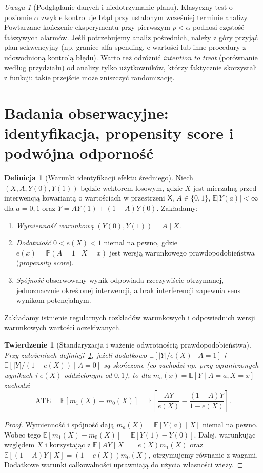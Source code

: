 \documentclass[11pt,a4paper,oneside]{report}
\numberwithin{equation}{chapter}
\theoremstyle{plain}
\newtheorem{twierdzenie}{Twierdzenie}[chapter]
\theoremstyle{definition}
\newtheorem{definicja}{Definicja}[chapter]
\theoremstyle{remark}
\newtheorem{uwaga}{Uwaga}[chapter]
\newcommand{\Prob}{\mathbb P}
\newcommand{\E}{\mathbb E}
\begin{document}
\begin{uwaga}[Podglądanie danych i niedotrzymanie planu]
Klasyczny test o poziomie $\alpha$ zwykle kontroluje błąd przy ustalonym wcześniej terminie analizy. Powtarzane kończenie eksperymentu przy pierwszym $p<\alpha$ podnosi częstość fałszywych alarmów. Jeśli potrzebujemy analiz pośrednich, należy z góry przyjąć plan sekwencyjny (np. granice alfa-spending, e-wartości lub inne procedury z udowodnioną kontrolą błędu). Warto też odróżnić \emph{intention to treat} (porównanie według przydziału) od analizy tylko użytkowników, którzy faktycznie skorzystali z funkcji: takie przejście może zniszczyć randomizację.
\end{uwaga}

\section{Badania obserwacyjne: identyfikacja, propensity score i podwójna odporność}
\begin{definicja}[Warunki identyfikacji efektu średniego]\label{def:causal-id}
Niech $(X,A,Y(0),Y(1))$ będzie wektorem losowym, gdzie $X$ jest mierzalną przed interwencją kowariantą o wartościach w przestrzeni $\mathsf X$, $A\in\{0,1\}$, $\E|Y(a)|<\infty$ dla $a=0,1$ oraz $Y=AY(1)+(1-A)Y(0)$. Zakładamy:
\begin{enumerate}
\item \emph{Wymienność warunkową} $(Y(0),Y(1))\perp A\mid X$.
\item \emph{Dodatniość} $0<e(X)<1$ niemal na pewno, gdzie $e(x)=\Prob(A=1\mid X=x)$ jest wersją warunkowego prawdopodobieństwa (\emph{propensity score}).
\item \emph{Spójność} obserwowany wynik odpowiada rzeczywiście otrzymanej, jednoznacznie określonej interwencji, a brak interferencji zapewnia sens wynikom potencjalnym.
\end{enumerate}
Zakładamy istnienie regularnych rozkładów warunkowych i odpowiednich wersji warunkowych wartości oczekiwanych.
\end{definicja}

\begin{twierdzenie}[Standaryzacja i ważenie odwrotnością prawdopodobieństwa]\label{thm:causal-ipw}
Przy założeniach definicji~\ref{def:causal-id}, jeżeli dodatkowo $\E[|Y|/e(X)\mid A=1]$ i $\E[|Y|/(1-e(X))\mid A=0]$ są skończone (co zachodzi np. przy ograniczonych wynikach i $e(X)$ oddzielonym od $0,1$), to dla $m_a(x)=\E[Y\mid A=a,X=x]$ zachodzi
\[
 \mathrm{ATE}=\E[m_1(X)-m_0(X)]
 =\E\!\left[\frac{AY}{e(X)}-\frac{(1-A)Y}{1-e(X)}\right].
\]
\end{twierdzenie}
\begin{proof}
Wymienność i spójność dają $m_a(X)=\E[Y(a)\mid X]$ niemal na pewno. Wobec tego $\E[m_1(X)-m_0(X)]=\E[Y(1)-Y(0)]$. Dalej, warunkując względem $X$ i korzystając z $\E[A Y\mid X]=e(X)m_1(X)$ oraz $\E[(1-A)Y\mid X]=(1-e(X))m_0(X)$, otrzymujemy równanie z wagami. Dodatkowe warunki całkowalności uprawniają do użycia własności wieży.
\end{proof}
\end{document}
